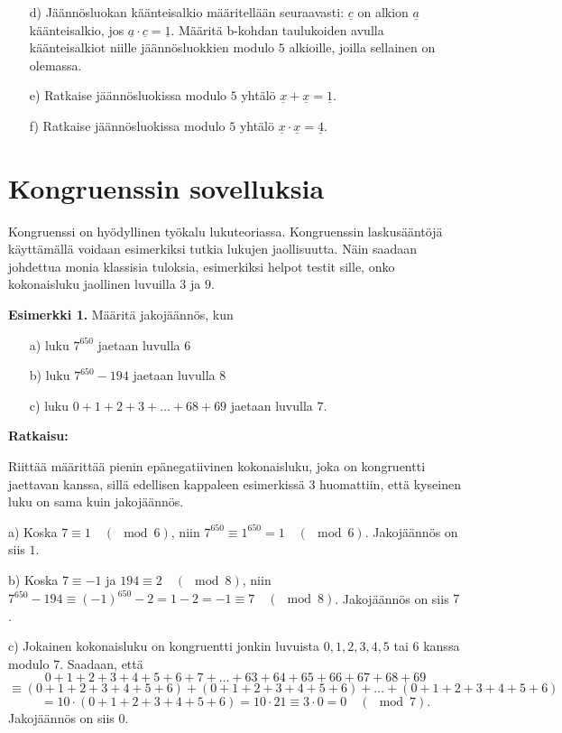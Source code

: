 \begin{enumerate}
\begin{itemize}
\item[d)] Jäännösluokan käänteisalkio määritellään seuraavasti: $\underline{c}$ on alkion $\underline{a}$ käänteisalkio, jos $\underline{a} \cdot \underline{c} = \underline{1}$. Määritä b-kohdan taulukoiden avulla käänteisalkiot niille jäännösluokkien modulo $5$ alkioille, joilla sellainen on olemassa.
\item[e)] Ratkaise jäännösluokissa modulo $5$ yhtälö $\underline{x}+\underline{x}=\underline{1}$.
\item[f)] Ratkaise jäännösluokissa modulo $5$ yhtälö $\underline{x}\cdot \underline{x}=\underline{4}$.
\end{itemize}

\end{enumerate}

\newpage

\section{Kongruenssin sovelluksia}
Kongruenssi on hyödyllinen työkalu lukuteoriassa. Kongruenssin laskusääntöjä käyttämällä voidaan esimerkiksi tutkia lukujen jaollisuutta. Näin saadaan johdettua monia klassisia tuloksia, esimerkiksi helpot testit sille, onko kokonaisluku jaollinen luvuilla $3$ ja $9$.

{\bf Esimerkki 1.}
Määritä jakojäännös, kun
\begin{itemize}
\item[a)] luku $7^{650}$ jaetaan luvulla $6$
\item[b)] luku $7^{650} - 194$ jaetaan luvulla $8$
\item[c)] luku $0+1+2+3+ \ldots + 68 + 69$ jaetaan luvulla $7$.
\end{itemize}

{\bf Ratkaisu:}

Riittää määrittää pienin epänegatiivinen kokonaisluku, joka on kongruentti jaettavan kanssa, sillä edellisen kappaleen esimerkissä 3 huomattiin, että kyseinen luku on sama kuin jakojäännös.

a) Koska $7 \equiv 1 \quad(\mod 6)$, niin $7^{650} \equiv 1^{650} = 1 \quad (\mod 6)$. Jakojäännös on siis $1$.

b) Koska $7 \equiv -1$ ja $194 \equiv 2 \quad(\mod 8)$, niin $7^{650} - 194 \equiv (-1)^{650} - 2 = 1 - 2 = -1 \equiv 7 \quad(\mod 8)$. Jakojäännös on siis $7$.

c) Jokainen kokonaisluku on kongruentti jonkin luvuista $0,1,2,3,4,5$ tai $6$ kanssa modulo $7$. Saadaan, että
\[
0+1+2+3+4+5+6+7+ \ldots +63+64+65+66+67+68+69
\]
\[
 \equiv (0+1+2+3+4+5+6)+(0+1+2+3+4+5+6)+ \ldots +(0+1+2+3+4+5+6)
\]
\[
=10 \cdot (0+1+2+3+4+5+6) = 10\cdot 21 \equiv 3\cdot 0 = 0 \quad(\mod 7).
\]
Jakojäännös on siis $0$.

